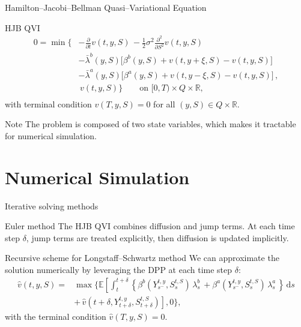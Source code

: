 \documentclass[10pt]{beamer}
\begin{document}
\begin{frame}{Hamilton--Jacobi--Bellman Quasi--Variational Equation}
\begin{block}{HJB QVI}\pause
\begin{equation}
\begin{aligned}
        0 = \min\bigg\{& -\frac{\partial}{\partial t} v(t, y, S) \, - \frac{1}{2} \sigma^2 \frac{\partial^2}{\partial S^2} v(t, y, S) \, \\
        & - \bar{\lambda}^b(y, S) \big[ \beta^b(y,S) + v(t, y +\xi, S) - v(t, y, S) \big] \, \nonumber \\
        & - \bar{\lambda}^a(y, S) \big[ \beta^a(y,S) + v(t, y - \xi, S) - v(t, y, S) \big]\,  , \\ 
        & \, v(t,y,S) \bigg\} \qquad \text{on } [0,T) \times  Q \times \mathbb R, \nonumber \\
\end{aligned}
\end{equation}
with terminal condition $v(T,y,S)=0$ for all $(y,S) \in Q \times \mathbb R$.
\end{block}\pause

\begin{alertblock}{Note}
The problem is composed of two state variables, which makes it tractable for numerical simulation.
\end{alertblock}

\end{frame}

\section{Numerical Simulation}
\begin{frame}{Iterative solving methods}

\begin{block}{Euler method}\pause
The HJB QVI combines diffusion and jump terms. At each time step $\delta$, jump terms are treated explicitly, then diffusion is updated implicitly.
\end{block}\pause

\begin{block}{Recursive scheme for Longstaff--Schwartz method}\pause
We can approximate the solution numerically by leveraging the DPP at each time step $\delta$:
\begin{equation}
\begin{aligned}
    \hat{v}(t,y,S) = & \max \Bigg\{ \mathbb{E} \left[ \int_{t}^{t+\delta} \left\{ 
    \beta^b\left(Y^{t,y}_{s^-}, S^{t,S}_s\right) \, \lambda^b_s \, + \beta^a\left(Y^{t,y}_{s^-}, S^{t,S}_s\right) \, \lambda^a_s \, \right\} \, \text{d}s \right. \nonumber \\
    & \left.  + \, \hat{v}\left(t+\delta, Y_{t+\delta}^{t, y}, S_{t+\delta}^{t, S}\right) \right], 0 \Bigg\}, \nonumber
\end{aligned}
\end{equation}
with the terminal condition $\hat{v}(T,y,S)=0$.
\end{block}

\end{frame}
\end{document}
